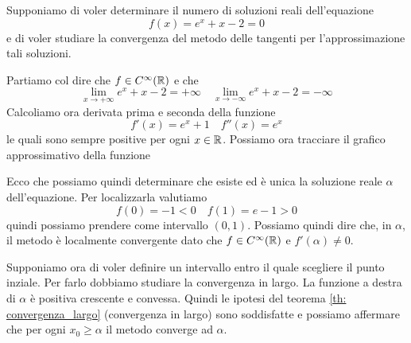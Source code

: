 \begin{example}
	Supponiamo di voler determinare il numero di soluzioni reali dell'equazione
	\[ f(x) = e^x + x - 2 = 0 \]
	e di voler studiare la convergenza del metodo delle tangenti per l'approssimazione tali soluzioni.

	Partiamo col dire che $f \in C^\infty (\mathbb{R})$ e che
	\[ \lim_{x \to +\infty} e^x + x - 2 = +\infty \quad \lim_{x \to -\infty} e^x + x - 2 = -\infty \]
	Calcoliamo ora derivata prima e seconda della funzione
	\[ f'(x) = e^x + 1 \quad f''(x) = e^x \]
	le quali sono sempre positive per ogni $x \in \mathbb{R}$. Possiamo ora tracciare il grafico approssimativo della
	funzione
	\begin{center}
	\end{center}
	Ecco che possiamo quindi determinare che esiste ed è unica la soluzione reale $\alpha$ dell'equazione. Per
	localizzarla valutiamo
	\[ f(0) = -1 < 0 \quad f(1) = e - 1 > 0 \]
	quindi possiamo prendere come intervallo $(0, 1)$. Possiamo quindi dire che, in $\alpha$, il metodo è
	localmente convergente dato che $f \in C^\infty(\mathbb{R})$ e $f'(\alpha) \neq 0$.

	Supponiamo ora di voler definire un intervallo entro il quale scegliere il punto inziale. Per farlo dobbiamo
	studiare la convergenza in largo. La funzione a destra di $\alpha$ è positiva crescente e convessa. Quindi
	le ipotesi del teorema \ref{th: convergenza_largo} (convergenza in largo) sono soddisfatte e possiamo
	affermare che per ogni $x_0 \geq \alpha$ il metodo converge ad $\alpha$.


\end{example}
